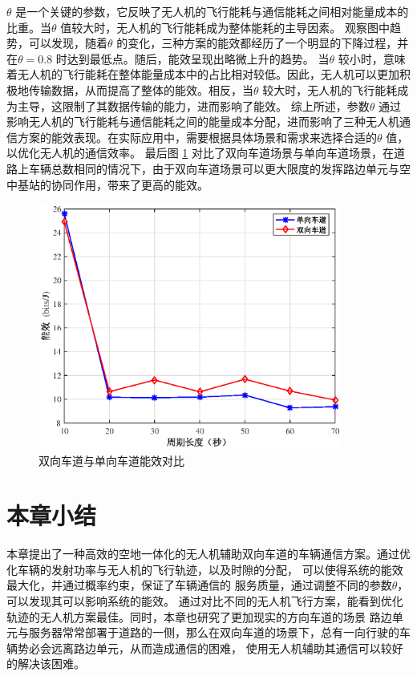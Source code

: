 $\theta$ 是一个关键的参数，它反映了无人机的飞行能耗与通信能耗之间相对能量成本的比重。当$\theta$ 值较大时，无人机的飞行能耗成为整体能耗的主导因素。
观察图中趋势，可以发现，随着$\theta$ 的变化，三种方案的能效都经历了一个明显的下降过程，并在$\theta=0.8$ 时达到最低点。随后，能效呈现出略微上升的趋势。
当$\theta$ 较小时，意味着无人机的飞行能耗在整体能量成本中的占比相对较低。因此，无人机可以更加积极地传输数据，从而提高了整体的能效。相反，当$\theta$ 较大时，无人机的飞行能耗成为主导，这限制了其数据传输的能力，进而影响了能效。
综上所述，参数$\theta$ 通过影响无人机的飞行能耗与通信能耗之间的能量成本分配，进而影响了三种无人机通信方案的能效表现。在实际应用中，需要根据具体场景和需求来选择合适的$\theta$ 值，以优化无人机的通信效率。
最后图 \ref{双向车道与单向车道的对比} 对比了双向车道场景与单向车道场景，在道路上车辆总数相同的情况下，由于双向车道场景可以更大限度的发挥路边单元与空中基站的协同作用，带来了更高的能效。

\begin{figure}[H]
\centering
\includegraphics[width=10cm]{figures//chap4//双向车道.eps}
\caption{双向车道与单向车道能效对比}
\label{双向车道与单向车道的对比}
\end{figure}
\section{本章小结}\label{section4-6}
本章提出了一种高效的空地一体化的无人机辅助双向车道的车辆通信方案。通过优化车辆的发射功率与无人机的飞行轨迹，以及时隙的分配，
可以使得系统的能效最大化，并通过概率约束，保证了车辆通信的 服务质量，通过调整不同的参数$\theta$，可以发现其可以影响系统的能效。
通过对比不同的无人机飞行方案，能看到优化轨迹的无人机方案最佳。同时，本章也研究了更加现实的方向车道的场景
路边单元与服务器常常部署于道路的一侧，那么在双向车道的场景下，总有一向行驶的车辆势必会远离路边单元，从而造成通信的困难，
使用无人机辅助其通信可以较好的解决该困难。

